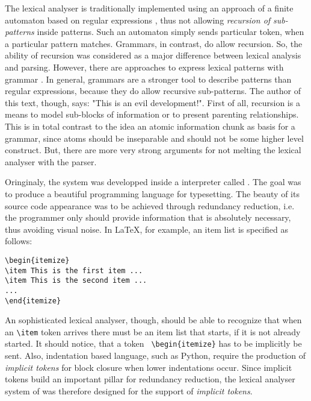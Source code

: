 The lexical analyser is traditionally implemented using an approach of a
finite automaton \cite{} based on regular expressions \cite{}, thus not
allowing {\it recursion of sub-patterns} inside patterns.  Such an automaton
simply sends particular token, when a particular pattern matches. Grammars, in
contrast, do allow recursion. So, the ability of recursion was considered as a
major difference between lexical analysis and parsing. However, 
there are approaches to express lexical patterns with grammar \cite{ANTLR}.
In general, grammars are a stronger tool to describe patterns than regular
expressions, because they do allow recursive sub-patterns.  The author of this
text, though, says: "This is an evil development!". First of all, recursion is
a means to model sub-blocks of information or to present parenting
relationships. This is in total contrast to the idea an atomic information
chunk as basis for a grammar, since atoms should be inseparable and should
not be some higher level construct. But, there are more very strong arguments
for not melting the lexical analyser with the parser.

Oringinaly, the {\quex} system was developped inside a interpreter called
{\SaferTeX}\cite{TUG-2004}. The goal was to produce a beautiful programming
language for typesetting. The beauty of its source code appearance was to be
achieved through redundancy reduction, i.e. the programmer only should provide
information that is absolutely necessary, thus avoiding visual noise. In
{\LaTeX}, for example, an item list is specified as follows:

\begin{lstlisting}
\begin{itemize}
\item This is the first item ...
\item This is the second item ...
...
\end{itemize}
\end{lstlisting}

An sophisticated lexical analyser, though, should be able to recognize that
when an {\tt \verb|\|item} token arrives there must be an item list that
starts, if it is not already started. It should notice, that a token {\tt
  \verb|\|begin\{itemize\}} has to be implicitly be sent. Also, indentation
based language, such as Python, require the production of {\it implicit
  tokens} for block closure when lower indentations occur. Since implicit
tokens build an important pillar for redundancy reduction, the lexical
analyser system of {\SaferTeX} was therefore designed for the support of {\it
  implicit tokens}. 

